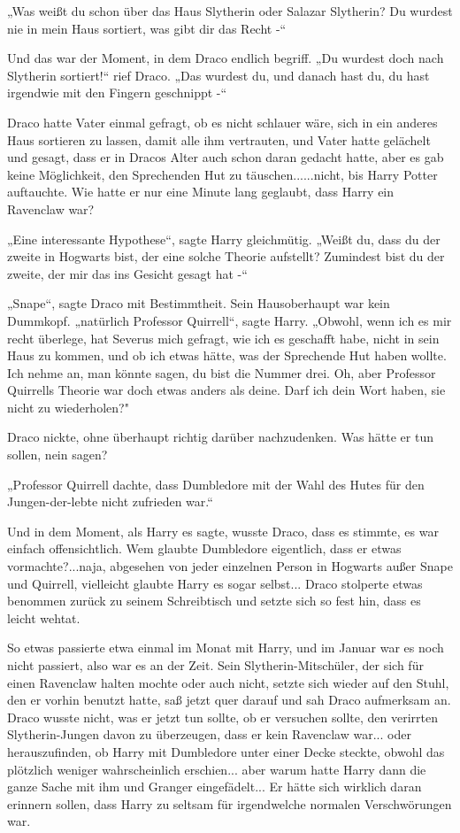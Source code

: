 {„Was weißt du schon über das Haus Slytherin oder Salazar Slytherin? Du wurdest nie in mein Haus sortiert, was gibt dir das Recht -“

Und das war der Moment, in dem Draco endlich begriff. „Du wurdest doch nach Slytherin sortiert!“ rief Draco. „Das wurdest du, und danach hast du, du hast irgendwie mit den Fingern geschnippt -“

Draco hatte Vater einmal gefragt, ob es nicht schlauer wäre, sich in ein anderes Haus sortieren zu lassen, damit alle ihm vertrauten, und Vater hatte gelächelt und gesagt, dass er in Dracos Alter auch schon daran gedacht hatte, aber es gab keine Möglichkeit, den Sprechenden Hut zu täuschen......nicht, bis Harry Potter auftauchte. Wie hatte er nur eine Minute lang geglaubt, dass Harry ein Ravenclaw war?

„Eine interessante Hypothese“, sagte Harry gleichmütig. „Weißt du, dass du der zweite in Hogwarts bist, der eine solche Theorie aufstellt? Zumindest bist du der zweite, der mir das ins Gesicht gesagt hat -“

„Snape“, sagte Draco mit Bestimmtheit. Sein Hausoberhaupt war kein Dummkopf. „natürlich Professor Quirrell“, sagte Harry. „Obwohl, wenn ich es mir recht überlege, hat Severus mich gefragt, wie ich es geschafft habe, nicht in sein Haus zu kommen, und ob ich etwas hätte, was der Sprechende Hut haben wollte. Ich nehme an, man könnte sagen, du bist die Nummer drei. Oh, aber Professor Quirrells Theorie war doch etwas anders als deine. Darf ich dein Wort haben, sie nicht zu wiederholen?"

Draco nickte, ohne überhaupt richtig darüber nachzudenken. Was hätte er tun sollen, nein sagen?

„Professor Quirrell dachte, dass Dumbledore mit der Wahl des Hutes für den Jungen-der-lebte nicht zufrieden war.“

Und in dem Moment, als Harry es sagte, wusste Draco, dass es stimmte, es war einfach offensichtlich. Wem glaubte Dumbledore eigentlich, dass er etwas vormachte?...naja, abgesehen von jeder einzelnen Person in Hogwarts außer Snape und Quirrell, vielleicht glaubte Harry es sogar selbst... Draco stolperte etwas benommen zurück zu seinem Schreibtisch und setzte sich so fest hin, dass es leicht wehtat.

So etwas passierte etwa einmal im Monat mit Harry, und im Januar war es noch nicht passiert, also war es an der Zeit. Sein Slytherin-Mitschüler, der sich für einen Ravenclaw halten mochte oder auch nicht, setzte sich wieder auf den Stuhl, den er vorhin benutzt hatte, saß jetzt quer darauf und sah Draco aufmerksam an. Draco wusste nicht, was er jetzt tun sollte, ob er versuchen sollte, den verirrten Slytherin-Jungen davon zu überzeugen, dass er kein Ravenclaw war... oder herauszufinden, ob Harry mit Dumbledore unter einer Decke steckte, obwohl das plötzlich weniger wahrscheinlich erschien... aber warum hatte Harry dann die ganze Sache mit ihm und Granger eingefädelt... Er hätte sich wirklich daran erinnern sollen, dass Harry zu seltsam für irgendwelche normalen Verschwörungen war.

}
